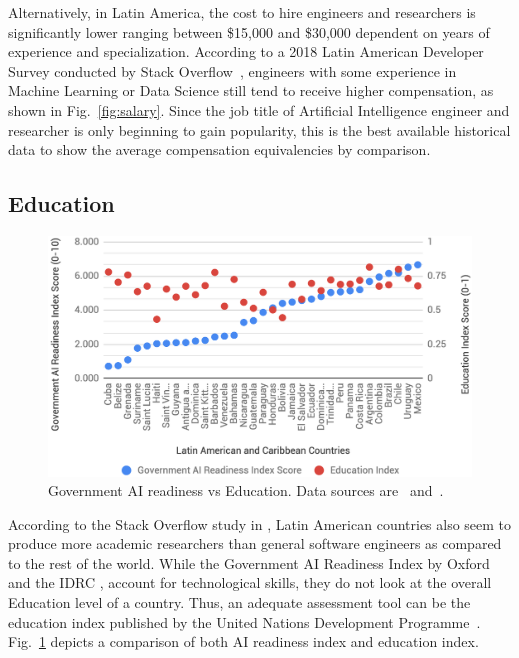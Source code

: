 \documentclass[conference]{IEEEtran}
\begin{document}
Alternatively, in Latin America, the cost to hire engineers and researchers is significantly lower ranging between \$15,000 and \$30,000 dependent on years of experience and specialization. According to a 2018 Latin American Developer Survey conducted by Stack Overflow~\cite{silge2018hiring}, engineers with some experience in Machine Learning or Data Science still tend to receive higher compensation, as shown in Fig.~\ref{fig:salary}. Since the job title of Artificial Intelligence engineer and researcher is only beginning to gain popularity, this is the best available historical data to show the average compensation equivalencies by comparison.


\subsection{Education}

\begin{figure}[!t]
\centering
\includegraphics[width=\columnwidth]{education}
\caption{Government AI readiness vs Education. Data sources are~\cite{miller2019government} and~\cite{undp2018education}.}
\label{fig:education}
\end{figure}

According to the Stack Overflow study in \cite{silge2018hiring}, Latin American countries also seem to produce more academic researchers than general software engineers as compared to the rest of the world. While the Government AI Readiness Index by Oxford and the IDRC \cite{miller2019government}, account for technological skills, they do not look at the overall Education level of a country. Thus, an adequate assessment tool can be the education index published by the United Nations Development Programme~\cite{undp2018education}. Fig.~\ref{fig:education} depicts a comparison of both AI readiness index and education index.
\end{document}
